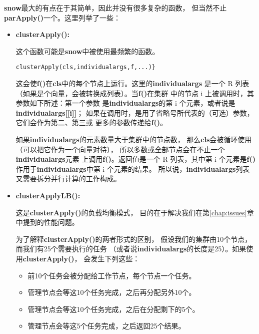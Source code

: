 {\bf snow}最大的有点在于其简单，因此并没有很多复杂的函数，
但当然不止{\bf parApply()}一个。这里列举了一些：

\begin{itemize}

\item {\bf clusterApply():}

这个函数可能是{\bf snow}中被使用最频繁的函数。

\begin{lstlisting}
clusterApply(cls,individualargs,f,...)}
\end{lstlisting}

这会使{\bf f()}在{\bf cls}中的每个节点上运行。这里的{\bf individualargs}
是一个 R 列表（如果是个向量，会被转换成列表）。当{\bf f()}在集群
中的节点 i 上被调用时，其参数如下所述：第一个参数
是{\bf individualargs}的第 i 个元素，或者说是{\bf individualargs[[i]]}；
如果在调用时，是用了省略号所代表的（可选）参数，它们会作为第二、第三或
更多的参数传递给{\bf f()}。

如果{\bf individualargs}的元素数量大于集群中的节点数，
那么{\bf cls}会被循环使用（可以把它作为一个向量对待），
所以多数或全部节点会在不止一个{\bf individualargs}元素
上调用{\bf f()}。返回值是一个 R 列表，其中第 i 个元素是{\bf f()}
作用于{\bf individualargs}中第 i 个元素的结果。
所以说，{\bf individualargs}列表又需要拆分并行计算的工作构成。

\item {\bf clusterApplyLB():}

这是{\bf clusterApply()}的负载均衡模式，
目的在于解决我们在第\ref{chap:issues}章中提到的性能问题。

为了解释{\bf clusterApply()}的两者形式的区别，
假设我们的集群由10个节点，而我们有25个需要执行的任务
（或者说{\bf individualargs}的长度是25）。如果使用{\bf clusterApply()}，
会发生下列这些：

\begin{itemize}

\item 前10个任务会被分配给工作节点，每个节点一个任务。

\item 管理节点会等这10个任务完成，之后再分配另外10个。

\item 管理节点会等这10个任务完成，之后在分配剩下的5个。

\item 管理节点会等这5个任务完成，之后返回25个结果。

\end{itemize}


\end{itemize}
